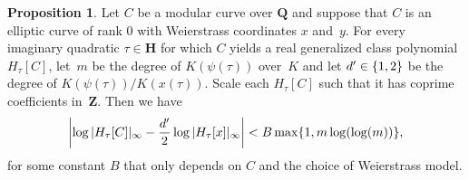 \documentclass{amsart}
\newcommand{\QQ}{\mathbf{Q}}
\newcommand{\HH}{\mathbf{H}}
\newcommand{\ZZ}{\mathbf{Z}}
\newcommand{\F}{H_\tau[\curve]}
\newcommand{\Fx}{H_\tau[x]}
\newcommand{\HC}{H_\tau[\curve]}
\newcommand{\curve}{C}
\numberwithin{equation}{section}
\theoremstyle{definition}
\newtheorem{proposition}[equation]{Proposition}
\begin{document}
\begin{proposition}\label{prop:reductionhyper}
	Let $C$ be a modular curve over $\QQ$
	and suppose that $C$ is an elliptic curve
	of rank $0$
	with Weierstrass coordinates $x$ and~$y$.
	For every imaginary quadratic $\tau\in\HH$ for which $C$
	yields a real generalized class polynomial~$\HC$,
	let~$m$ be the degree of $K(\psi(\tau))$ over~$K$ and let ${d'}\in\{1,2\}$ be the degree of $K(\psi(\tau))/K(x(\tau))$.
	Scale each $\F$ such that it has coprime coefficients in~$\ZZ$. Then we have 
\begin{equation*}
\left| \log |\F|_\infty - \frac{\wase}{2}\log |\Fx|_\infty\right| < B\max\{1,m\log(\log(m))\},
\end{equation*}
    for some constant $B$ that only depends on $C$ and the choice of Weierstrass model.
\end{proposition}
\end{document}
